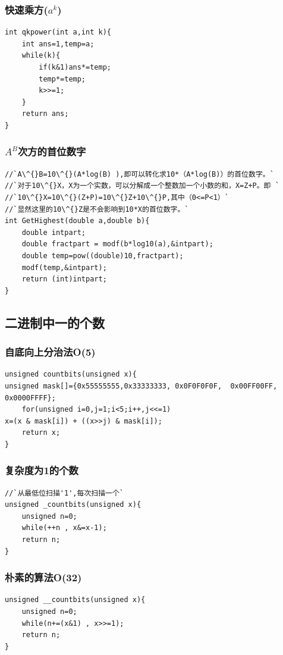 \documentclass[a4paper]{article}
\begin{document}
\begin{CJK*}{UTF8}{gbsn}
\begin{multicols}{3}
\begin{flushleft}
\subsubsection{快速乘方($a^k$)}
\begin{lstlisting}
int qkpower(int a,int k){
	int ans=1,temp=a;
	while(k){
		if(k&1)ans*=temp;
		temp*=temp;
		k>>=1; 
	} 
	return ans; 
} 
\end{lstlisting}


\subsubsection{$A^B$次方的首位数字}
\begin{lstlisting}
//`A\^{}B=10\^{}(A*log(B) ),即可以转化求10*（A*log(B)）的首位数字。`
//`对于10\^{}X，X为一个实数，可以分解成一个整数加一个小数的和，X=Z+P。即 `
//`10\^{}X=10\^{}(Z+P)=10\^{}Z+10\^{}P,其中（0<=P<1）`
//`显然这里的10\^{}Z是不会影响到10*X的首位数字。`
int GetHighest(double a,double b){
    double intpart;
    double fractpart = modf(b*log10(a),&intpart);
    double temp=pow((double)10,fractpart);
    modf(temp,&intpart);
    return (int)intpart;  
}
\end{lstlisting}



\subsection{二进制中一的个数}

\subsubsection{自底向上分治法O(5)}
\begin{lstlisting}
unsigned countbits(unsigned x){
unsigned mask[]={0x55555555,0x33333333, 0x0F0F0F0F,  0x00FF00FF, 0x0000FFFF};
	for(unsigned i=0,j=1;i<5;i++,j<<=1)
x=(x & mask[i]) + ((x>>j) & mask[i]);
	return x;
} 
\end{lstlisting}


\subsubsection{复杂度为1的个数}
\begin{lstlisting}
//`从最低位扫描'1',每次扫描一个`
unsigned _countbits(unsigned x){
	unsigned n=0;
	while(++n , x&=x-1);
	return n;
} 
\end{lstlisting}


\subsubsection{朴素的算法O(32)}
\begin{lstlisting}
unsigned __countbits(unsigned x){
	unsigned n=0;
	while(n+=(x&1) , x>>=1);
	return n;
}
\end{lstlisting}


\end{flushleft}
\end{multicols}
\end{CJK*}
\end{document}
